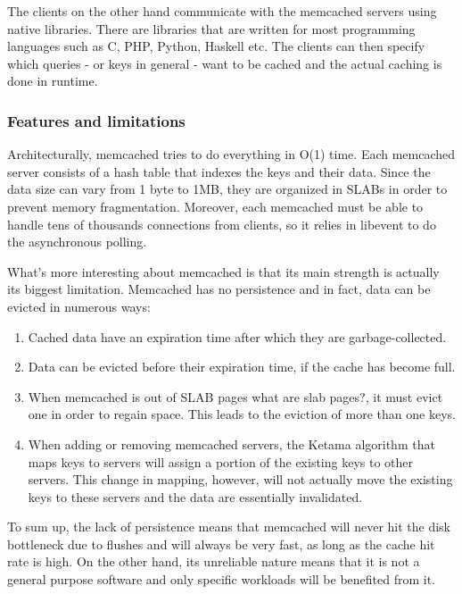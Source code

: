 The clients on the other hand communicate with the memcached servers using 
native libraries. There are libraries that are written for most programming 
languages such as C, PHP, Python, Haskell etc. The clients can then specify 
which queries - or keys in general - want to be cached and the actual caching 
is done in runtime.

\subsubsection{Features and limitations}

Architecturally, memcached tries to do everything in O(1) time. Each memcached 
server consists of a hash table that indexes the keys and their data. Since the 
data size can vary from 1 byte to 1MB, they are organized in SLABs in order to 
prevent memory fragmentation.  Moreover, each memcached must be able to handle 
tens of thousands connections from clients, so it relies in libevent to do the 
asynchronous polling.

What's more interesting about memcached is that its main strength is actually 
its biggest limitation. Memcached has no persistence and in fact, data can be 
evicted in numerous ways:

\begin{enumerate}
	\item Cached data have an expiration time after which they are 
		garbage-collected.
	\item Data can be evicted before their expiration time, if the cache 
		has become full.
	\item When memcached is out of SLAB pages \fixme what are slab pages?, 
		it must evict one in order to regain space. This leads to the 
		eviction of more than one keys.
	\item When adding or removing memcached servers, the Ketama algorithm 
		that maps keys to servers will assign a portion of the existing 
		keys to other servers. This change in mapping, however, will 
		not actually move the existing keys to these servers and the 
		data are essentially invalidated.
\end{enumerate}

To sum up, the lack of persistence means that memcached will never hit the disk 
bottleneck due to flushes and will always be very fast, as long as the cache 
hit rate is high. On the other hand, its unreliable nature means that it is not 
a general purpose software and only specific workloads will be benefited from 
it.

